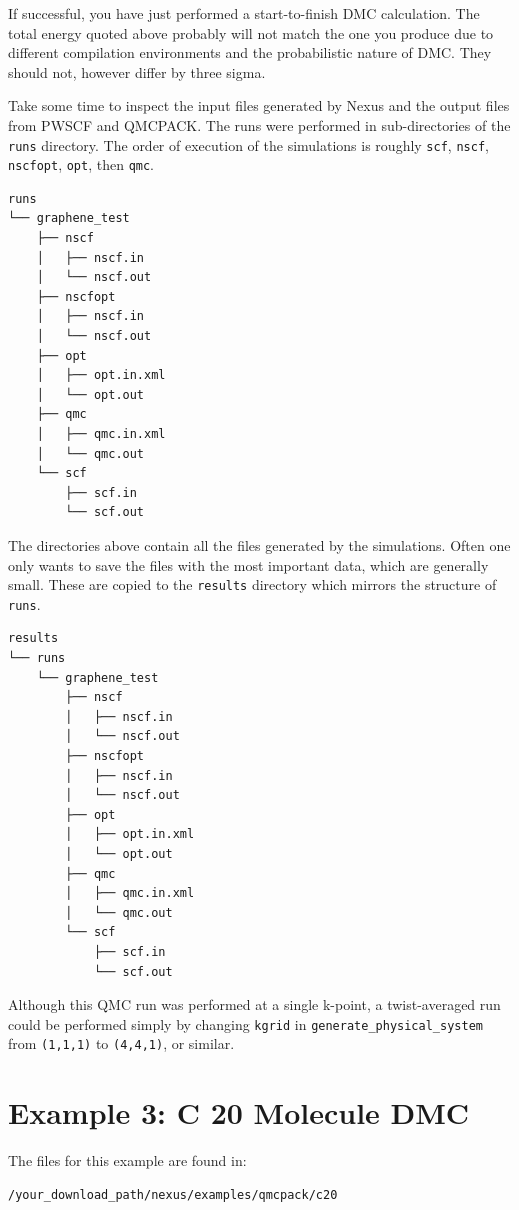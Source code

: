 \documentclass[oneside,11pt]{memoir}
\numberwithin{equation}{section}
\begin{document}
If successful, you have just performed a start-to-finish DMC calculation.  
The total energy quoted above probably will not match the one you produce 
due to different compilation environments and the probabilistic nature of 
DMC.  They should not, however differ by three sigma.

Take some time to inspect the input files generated by Nexus and 
the output files from PWSCF and QMCPACK.  The runs were performed in 
sub-directories of the \texttt{runs} directory.  The order of execution of 
the simulations is roughly \texttt{scf}, \texttt{nscf}, \texttt{nscfopt}, 
\texttt{opt}, then \texttt{qmc}.

\begin{shaded}
\begin{verbatim}
runs
└── graphene_test
    ├── nscf
    │   ├── nscf.in
    │   └── nscf.out
    ├── nscfopt
    │   ├── nscf.in
    │   └── nscf.out
    ├── opt
    │   ├── opt.in.xml
    │   └── opt.out
    ├── qmc
    │   ├── qmc.in.xml
    │   └── qmc.out
    └── scf
        ├── scf.in
        └── scf.out
\end{verbatim}
\end{shaded}

The directories above contain all the files generated by the simulations.  
Often one only wants to save the files with the most important data, which 
are generally small.  These are copied to the \texttt{results} directory 
which mirrors the structure of \texttt{runs}. 

\begin{shaded}
\begin{verbatim}
results
└── runs
    └── graphene_test
        ├── nscf
        │   ├── nscf.in
        │   └── nscf.out
        ├── nscfopt
        │   ├── nscf.in
        │   └── nscf.out
        ├── opt
        │   ├── opt.in.xml
        │   └── opt.out
        ├── qmc
        │   ├── qmc.in.xml
        │   └── qmc.out
        └── scf
            ├── scf.in
            └── scf.out
\end{verbatim}
\end{shaded}

Although this QMC run was performed at a single k-point, a twist-averaged run 
could be performed simply by changing \texttt{kgrid} in 
\texttt{generate\_physical\_system} from \texttt{(1,1,1)} to \texttt{(4,4,1)}, 
or similar.
 





\pagebreak
\section{Example 3: C 20 Molecule DMC}  \label{c20_dmc}
The files for this example are found in:
\begin{shaded}
\begin{verbatim}
/your_download_path/nexus/examples/qmcpack/c20
\end{verbatim}
\end{shaded}
\end{document}

